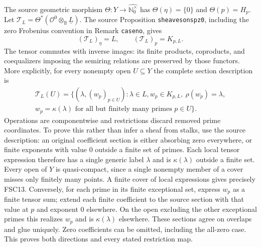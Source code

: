 The source geometric morphism $\Theta:Y\to\widehat{\mathbb N_0^\times}$
has $\Theta(\eta)=\{0\}$ and $\Theta(p)=H_p$.
Let $\mathcal T_L=\Theta^*(\mathcal O^0\otimes_{\mathbb B}\underline L)$.
The source Proposition \texttt{sheavesonspz0}, including the zero
Frobenius convention in Remark \texttt{caseno}, gives
\begin{equation}\tag{FSC12}
 (\mathcal T_L)_\eta=L,\qquad(\mathcal T_L)_p=K_{p,L}.
\end{equation}
The tensor commutes with inverse images: its finite products,
coproducts, and coequalizers imposing the semiring relations are
preserved by those functors. More explicitly, for every nonempty open
$U\subseteq Y$ the complete section description is
\begin{equation}\tag{FSC13}
 \begin{gathered}
 \mathcal T_L(U)=\{(\lambda,(w_p)_{p\in U}):
       \lambda\in L, w_p\in K_{p,L},\ \rho(w_p)=\lambda,\\
       w_p=\kappa(\lambda)\text{ for all but finitely many primes }p\in U\}.
 \end{gathered}
\end{equation}
Operations are componentwise and restrictions discard removed prime
coordinates. To prove this rather than infer a sheaf from stalks,
use the source description: an original coefficient section is either
absorbing zero everywhere, or finite exponents with value $0$ outside
a finite set of primes. Each local tensor expression therefore has a
single generic label $\lambda$ and is $\kappa(\lambda)$ outside a
finite set. Every open of $Y$ is quasi-compact, since a single nonempty
member of a cover misses only finitely many points. A finite cover of
local expressions gives precisely FSC13. Conversely, for each prime
in its finite exceptional set, express $w_p$ as a finite tensor sum;
extend each finite coefficient to the source section with that value
at $p$ and exponent $0$ elsewhere. On the open excluding the other
exceptional primes this realizes $w_p$ and is $\kappa(\lambda)$
elsewhere. These sections agree on overlaps and glue uniquely. Zero
coefficients can be omitted, including the all-zero case. This proves
both directions and every stated restriction map.

